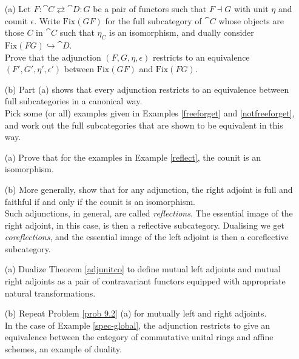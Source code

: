\vspace*{0.1in}

\begin{problem}\label{prob 9.2}\hfill
\begin{itemize}
\item[(a)] Let $F:\cat{C} \rightleftarrows \cat{D}:G$ be a pair of functors such that $F\dashv G$ with unit $\eta$ and counit $\epsilon$. Write $\mathrm{Fix}(GF)$ for the full subcategory of $\cat{C}$ whose objects are those $C$ in $\cat{C}$ such that $\eta_C$ is an isomorphism, and dually consider $\mathrm{Fix}(FG) \hookrightarrow \cat{D}$.\\[0.5em]
Prove that the adjunction $(F,G,\eta,\epsilon)$ restricts to an equivalence $(F',G', \eta', \epsilon')$ between $\mathrm{Fix}(GF)$ and $\mathrm{Fix}(FG)$.
\item[(b)] Part (a) shows that every adjunction restricts to an equivalence between full subcategories in a canonical way.\\[0.5em]
Pick some (or all) examples given in Examples \ref{freeforget} and \ref{notfreeforget}, and work out the full subcategories that are shown to be equivalent in this way.
\end{itemize}
\end{problem}

\vspace*{0.1in}

\begin{problem}\label{prob 9.3}\hfill
\begin{itemize}
\item[(a)] Prove that for the examples in Example \ref{reflect}, the counit is an isomorphism.
\item[(b)] More generally, show that for any adjunction, the right adjoint is full and faithful if and only if the counit is an isomorphism.\\[1em]
Such adjunctions, in general, are called \emph{reflections}. The essential image of the right adjoint, in this case, is then a reflective subcategory. Dualising we get \emph{coreflections}, and the essential image of the left adjoint is then a coreflective subcategory.
\end{itemize}
\end{problem}

\vspace*{0.1in}

\begin{problem}\label{prob 9.4}\hfill
\begin{itemize}
\item[(a)] Dualize Theorem \ref{adjunitco} to define mutual left adjoints and mutual right adjoints as a pair of contravariant functors equipped with appropriate natural transformations.
\item[(b)] Repeat Problem \ref{prob 9.2} (a) for mutually left and right adjoints. \\[1em]
In the case of Example \ref{spec-global}, the adjunction restricts to give an equivalence between the category of commutative unital rings and affine schemes, an example of duality.
\end{itemize}
\end{problem}

